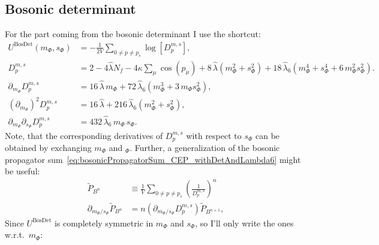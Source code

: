 \subsection*{Bosonic determinant}
For the part coming from the bosonic determinant I use the shortcut:
 \begin{align}\label{eq:CEP_bosonicDeterminantContribution_shortcut}
  U^{\text{BosDet}}(m_{\Phi},s_{\Phi}) &= - \frac{1}{2V}\sum\limits_{0 \neq p \neq p_s} \log \left[ D_p^{m,s} \right],
       \nonumber \\
   D_p^{m,s}                                 &=  2 - 4 \hat\lambda N_f - 4 \kappa \sum_{\mu} \cos(p_{\mu}) + 8\, \hat \lambda \left(m_{\Phi}^2 + s_{\Phi}^2 \right) 
                                        + 18\, \hat\lambda_6\left( m_{\Phi}^4 + s_{\Phi}^4 + 6\,  m_{\Phi}^2 s_{\Phi}^2 \right).
       \\ \label{eq:CEP_derivativeShortcutD_dm}
   \partial_{m_{\Phi}}  D_p^{m,s} & = 16\, \hat\lambda\,  m_{\Phi}  + 72\,\hat\lambda_6 \left( m_{\Phi}^3 + 3\, m_{\Phi} s_{\Phi}^2 \right),
   \\ \label{eq:CEP_derivativeShortcutD_dmdm}
   \left(\partial_{m_{\Phi}}\right)^2  D_p^{m,s} & = 16\, \hat\lambda + 216\,\hat\lambda_6 \left( m_{\Phi}^2 + s_{\Phi}^2 \right),
   \\ \label{eq:CEP_derivativeShortcutD_dmds}
   \partial_{m_{\Phi}} \partial_{s_{\Phi}} D_p^{m,s} & = 432\,\hat\lambda_6 \, m_{\Phi}\, s_{\Phi}.
 \end{align}
Note, that the corresponding derivatives of $D_p^{m,s}$ with respect to $s_{\Phi}$ can be obtained by exchanging $m_{\Phi}$ and $_{\Phi}$. 
Further, a generalization of the bosonic propagator sum~\eqref{eq:bosonicPropagatorSum_CEP_withDetAndLambda6} might be useful:
\begin{align}\label{eq:def_powersOfPropSumWithDerivative}
 \tilde P_{B^n} & \equiv \frac{1}{V}\sum\limits_{0\neq p\neq p_s} \left(\frac{1}{ D_p^{m,s}}\right)^n
     \\ \label{eq:derivative_Of_P_Bn}
 \partial_{m_{\Phi}/s_{\Phi}} \tilde P_{B^n} & = n \left( \partial_{m_{\Phi}/s_{\Phi}} D_p^{m,s} \right) \tilde P_{B^{n+1}},
\end{align}
% 
Since $U^{\text{BosDet}}$ is completely symmetric in $m_{\Phi}$ and $s_{\Phi}$, so I'll only write the ones w.r.t.\ $m_{\Phi}$:
